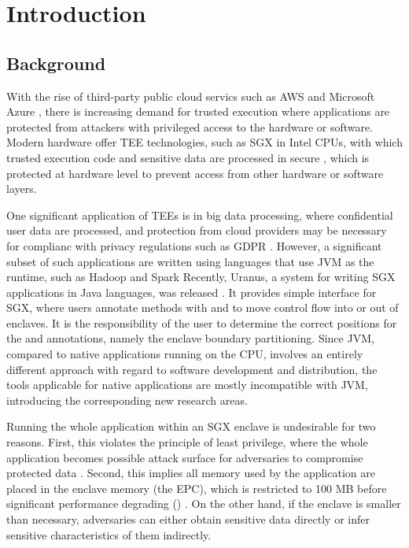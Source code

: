 \section{Introduction}
\subsection{Background}
With the rise of third-party public cloud servics
such as AWS \cite{aws} and Microsoft Azure \cite{azure},
there is increasing demand for trusted execution where
applications are protected from
attackers with privileged access to the hardware or software.
Modern hardware offer TEE technologies,
such as SGX in Intel CPUs,
with which trusted execution code and sensitive data
are processed in secure ,
which is protected at hardware level to prevent access
from other hardware or software layers.

One significant application of TEEs is in big data processing,
where confidential user data are processed,
and protection from cloud providers may be necessary
for complianc with privacy regulations such as GDPR \cite{gdpr}.
However, a significant subset of such applications are written
using languages that use JVM as the runtime,
such as Hadoop \cite{apachehadoop} and Spark \cite{apachespark}
Recently, Uranus, a system for
writing SGX applications in Java languages, was released \cite{uranus}.
It provides simple interface for SGX,
where users annotate methods with  and 
to move control flow into or out of enclaves.
It is the responsibility of the user to determine the correct positions
for the  and  annotations,
namely the enclave boundary partitioning.
Since JVM, compared to native applications running on the CPU,
involves an entirely different approach
with regard to software development and distribution,
the tools applicable for native applications are mostly incompatible with JVM,
introducing the corresponding new research areas.

Running the whole application within an SGX enclave is undesirable for two reasons.
First, this violates the principle of least privilege,
where the whole application becomes possible attack surface
for adversaries to compromise protected data \cite{glamdring}.
Second, this implies all memory used by the application
are placed in the enclave memory (the EPC),
which is restricted to 100 MB before significant performance degrading
() \cite{uranus}.
On the other hand, if the enclave is smaller than necessary,
adversaries can either obtain sensitive data directly or
infer sensitive characteristics of them indirectly.

